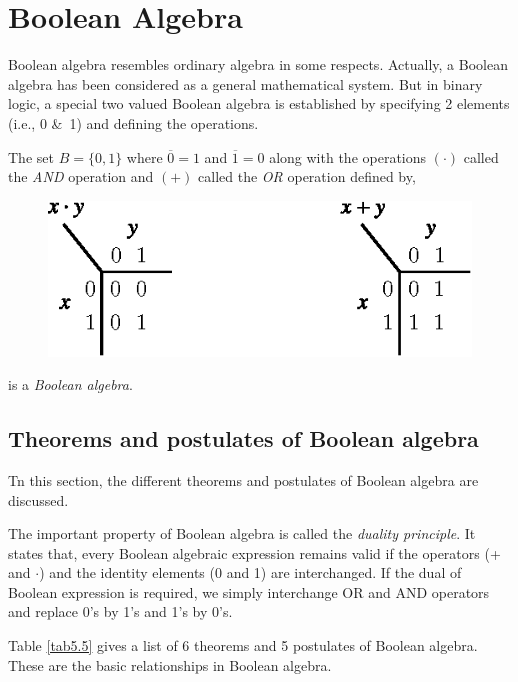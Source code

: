 \section{Boolean Algebra}\label{sec5.12}

Boolean algebra resembles ordinary algebra in some respects. Actually, a Boolean algebra has been considered as a general mathematical system. But in binary logic, a special two valued Boolean algebra is established by specifying 2 elements (i.e., 0 \&\ 1) and defining the operations.

The set $B=\{0,1\}$ where $\overline{0}=1$ and $\overline{1}=0$ along with the operations $(\cdot)$ called the {\em AND} operation and $(+)$ called the {\em OR} operation defined by,
\begin{figure}[H]
\centering
\includegraphics[scale=.97]{chap5/fig5.7.eps}
\end{figure}
\noindent
is a {\em Boolean algebra}.

\subsection{Theorems and postulates of Boolean algebra}\label{sec5.12.1}

Tn this section, the different theorems and postulates of Boolean algebra are discussed.

\smallskip
{} The important property of Boolean algebra is called the {\em duality principle}. It states that, every Boolean algebraic expression remains valid if the operators (+ and $\cdot$) and the identity elements (0 and 1) are interchanged. If the dual of Boolean expression is required, we simply interchange OR and AND operators and replace 0's by 1's and 1's by 0's.

Table \ref{tab5.5} gives a list of 6 theorems and 5 postulates of Boolean algebra. These are the basic relationships in Boolean algebra.

\vfill\eject

